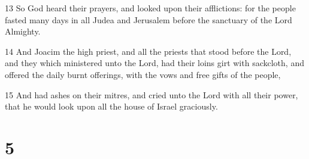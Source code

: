 \par 13 So God heard their prayers, and looked upon their afflictions: for the people fasted many days in all Judea and Jerusalem before the sanctuary of the Lord Almighty.
\par 14 And Joacim the high priest, and all the priests that stood before the Lord, and they which ministered unto the Lord, had their loins girt with sackcloth, and offered the daily burnt offerings, with the vows and free gifts of the people,
\par 15 And had ashes on their mitres, and cried unto the Lord with all their power, that he would look upon all the house of Israel graciously.

\chapter{5}


